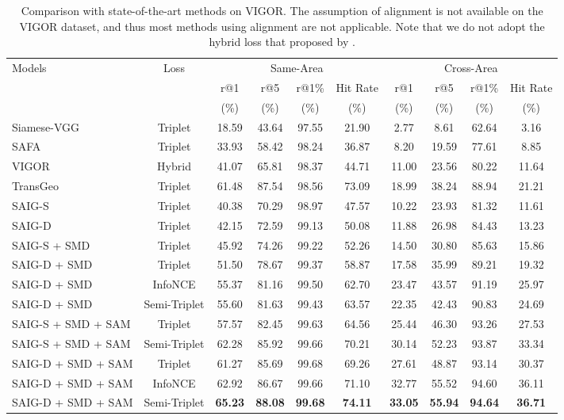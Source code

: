 \documentclass[sn-basic,iicol]{sn-jnl}
\theoremstyle{thmstyletwo}\newtheorem{example}{Example}\newtheorem{remark}{Remark}
\theoremstyle{thmstylethree}\newtheorem{definition}{Definition}
\begin{document}
\begin{table*}[htb]\scriptsize
\setlength{\abovecaptionskip}{0.2cm}
\centering
\begin{tabular}{l|c|cccc|cccc}
\toprule
\multirow{3}{*}{Models} & \multirow{3}{*}{Loss} & \multicolumn{4}{c|}{Same-Area}&\multicolumn{4}{c}{Cross-Area}\\ \cmidrule(lr){3-6} \cmidrule(lr){7-10} 
~ & ~ & r@1 & r@5& r@1\%& Hit Rate &  r@1 & r@5& r@1\%&Hit Rate\\ 
~ & ~ &  (\%) & (\%) & (\%) & (\%)& (\%) & (\%) & (\%) & (\%) \\\midrule
Siamese-VGG & Triplet &18.59&43.64&97.55&21.90&2.77&8.61&62.64&3.16 \\
SAFA & Triplet & 33.93&58.42&98.24&36.87&8.20&19.59&77.61&8.85 \\ 
VIGOR & Hybrid & 41.07&65.81&98.37&44.71&11.00&23.56&80.22&11.64 \\ 
TransGeo& Triplet & 61.48&87.54&98.56&73.09&18.99&38.24&88.94&21.21 \\ 
\midrule
SAIG-S & Triplet & 40.38 & 70.29 & 98.97& 47.57& 10.22 &23.93 & 81.32& 11.61\\
SAIG-D & Triplet& 42.15 & 72.59& 99.13& 50.08&11.88 & 26.98& 84.43& 13.23\\
\midrule
SAIG-S + SMD   & Triplet& 45.92 & 74.26 & 99.22 & 52.26 & 14.50 & 30.80 & 85.63 & 15.86 \\
SAIG-D + SMD &Triplet & 51.50 & 78.67& 99.37& 58.87&17.58 & 35.99& 89.21& 19.32\\
SAIG-D + SMD & InfoNCE & 55.37 & 81.16& 99.50& 62.70& 23.47 & 43.57 & 91.19 & 25.97 \\
SAIG-D + SMD &Semi-Triplet & 55.60 & 81.63& 99.43& 63.57& 22.35 & 42.43 & 90.83 & 24.69 \\
SAIG-S + SMD + SAM & Triplet& 57.57 & 82.45 & 99.63 & 64.56 & 25.44 & 46.30 & 93.26 & 27.53 \\
SAIG-S + SMD + SAM & Semi-Triplet & 62.28 & 85.92 & 99.66 & 70.21 & 30.14 & 52.23 & 93.87 & 33.34 \\
SAIG-D + SMD + SAM &Triplet & 61.27 & 85.69& 99.68& 69.26& 27.61 & 48.87 & 93.14 & 30.37 \\
SAIG-D + SMD + SAM &InfoNCE & 62.92 & 86.67 & 99.66 & 71.10 & 32.77 & 55.52 & 94.60 & 36.11 \\
SAIG-D + SMD + SAM &Semi-Triplet & \textbf{65.23} & \textbf{88.08}& \textbf{99.68}& \textbf{74.11}&\textbf{33.05} & \textbf{55.94}& \textbf{94.64}& \textbf{36.71}\\
\bottomrule

\end{tabular}\caption{Comparison with state-of-the-art methods on VIGOR. The assumption of alignment is not available on the VIGOR dataset, and thus most methods using alignment are not applicable. Note that we do not adopt the hybrid loss that proposed by \protect\cite{VIGOR2021}.}
\label{VIGOR}
\end{table*}
\end{document}
